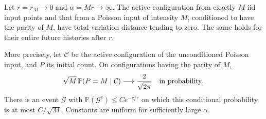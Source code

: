 \documentclass[11pt,letterpaper]{article}
\newcommand{\PP}{\mathbb P}\newcommand{\EE}{\mathbb E}
\begin{document}
\begin{lemma}
\label{lem:mesoscopic-depoisson-TV}
Let $r=r_M\to0$ and $\alpha=Mr\to\infty$. The active configuration
from exactly $M$ iid input points and that from a Poisson input
of intensity $M$, conditioned to have the parity of $M$, have
total-variation distance tending to zero. The same holds for
their entire future histories after $r$.

More precisely, let $\mathcal C$ be the active configuration of
the unconditioned Poisson input, and $P$ its initial count.
On configurations having the parity of $M$,
\begin{equation}\label{eq:conditional-count-local-CLT}
 \sqrt M\,\PP(P=M\mid\mathcal C)
          \longrightarrow\frac2{\sqrt{2\pi}}
                                      \quad\hbox{in probability}.
\end{equation}
There is an event $\mathcal G$ with
$\PP(\mathcal G^c)\le Ce^{-c/r}$ on which this conditional
probability is at most $C/\sqrt M$. Constants are uniform for
sufficiently large $\alpha$.
\end{lemma}
\end{document}
